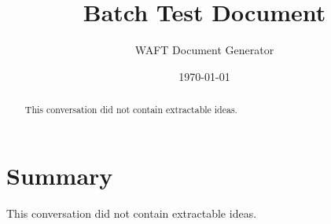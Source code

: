 \documentclass[11pt,letterpaper]{article}
\title{Batch Test Document}
\author{WAFT Document Generator}
\date{\today}
\begin{document}
\maketitle

\begin{abstract}
This conversation did not contain extractable ideas.
\end{abstract}

\section{Summary}
This conversation did not contain extractable ideas.
\end{document}
